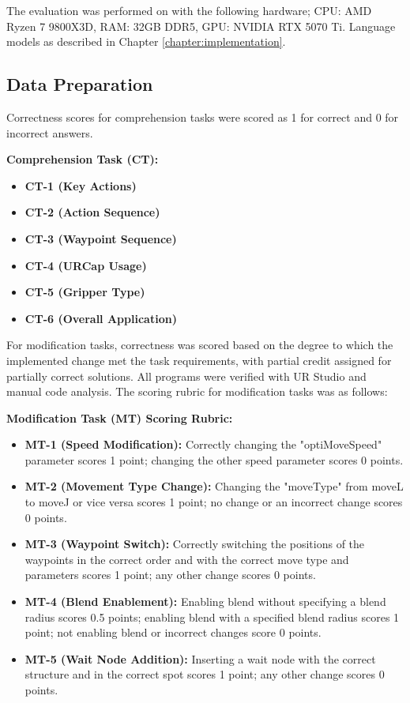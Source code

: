 The evaluation was performed on with the following hardware; CPU: AMD Ryzen 7 9800X3D, RAM: 32GB DDR5, GPU: NVIDIA RTX 5070 Ti. Language models as described in Chapter \ref{chapter:implementation}.

\subsection{Data Preparation}
Correctness scores for comprehension tasks were scored as 1 for correct and 0 for incorrect answers.

\textbf{Comprehension Task (CT):}
\begin{itemize}
    \item \textbf{CT-1 (Key Actions)}
    \item \textbf{CT-2 (Action Sequence)}
    \item \textbf{CT-3 (Waypoint Sequence)}
    \item \textbf{CT-4 (URCap Usage)}
    \item \textbf{CT-5 (Gripper Type)}
    \item \textbf{CT-6 (Overall Application)}
\end{itemize}

For modification tasks, correctness was scored based on the degree to which the implemented change met the task requirements, with partial credit assigned for partially correct solutions. All programs were verified with UR Studio and manual code analysis. The scoring rubric for modification tasks was as follows:

\textbf{Modification Task (MT) Scoring Rubric:}
\begin{itemize}
    \item \textbf{MT-1 (Speed Modification):} Correctly changing the "optiMoveSpeed" parameter scores 1 point; changing the other speed parameter scores 0 points.
    \item \textbf{MT-2 (Movement Type Change):} Changing the "moveType" from moveL to moveJ or vice versa scores 1 point; no change or an incorrect change scores 0 points.
    \item \textbf{MT-3 (Waypoint Switch):} Correctly switching the positions of the waypoints in the correct order and with the correct move type and parameters scores 1 point; any other change scores 0 points.
    \item \textbf{MT-4 (Blend Enablement):} Enabling blend without specifying a blend radius scores 0.5 points; enabling blend with a specified blend radius scores 1 point; not enabling blend or incorrect changes score 0 points.
    \item \textbf{MT-5 (Wait Node Addition):} Inserting a wait node with the correct structure and in the correct spot scores 1 point; any other change scores 0 points.
\end{itemize}

